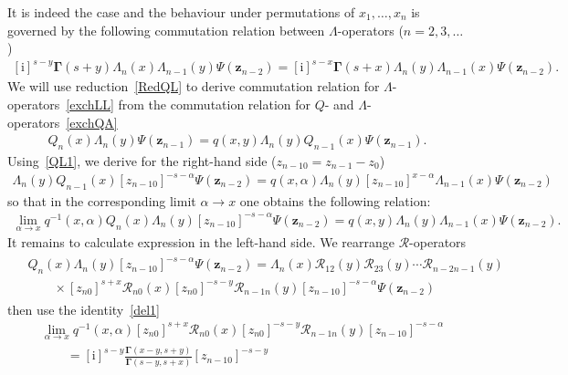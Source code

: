 \documentclass[pdftex]{sigma}
\renewcommand{\imath}{\mathrm{i}}
\numberwithin{equation}{section}
\begin{document}
It is indeed the case and the behaviour under permutations of $x_1, \dots, x_n$ is governed by the following
commutation relation between $\Lambda$-operators ($n=2 ,3 ,\dots$)
\begin{align} \label{exchLL}
[\imath]^{s-y} \mathbf{\Gamma}(s+y)
\Lambda_n(x) \Lambda_{n-1}(y) \Psi(\bm z_{n-2}) =
[\imath]^{s-x} \mathbf{\Gamma}(s+x)
\Lambda_n(y) \Lambda_{n-1}(x) \Psi(\bm z_{n-2}) .
\end{align}
We will use reduction~\eqref{RedQL} to derive commutation relation for $\Lambda$-operators~\eqref{exchLL} from the
commutation relation for $Q$- and $\Lambda$-operators~\eqref{exchQA}
\begin{align*}
Q_n( x) \Lambda_{n}( y) \Psi(\bm z_{n-1}) =
q(x,y) \Lambda_{n}( y) Q_{n-1}( x) \Psi(\bm z_{n-1}) .
\end{align*}
Using~\eqref{QL1}, we derive for the right-hand side ($z_{n-1 0} = z_{n-1} - z_0$)
\begin{align*}
\Lambda_n( y) Q_{n-1}( x) [z_{n-1 0}]^{-s-\alpha} \Psi(\bm z_{n-2}) =
q(x,\alpha) \Lambda_n( y) [z_{n-1 0}]^{x-\alpha} \Lambda_{n-1}(x) \Psi(\bm z_{n-2})
\end{align*}
so that in the corresponding limit $\alpha \to x$ one obtains the following relation:
\begin{align*}
\lim\limits_{\alpha\to x}
 q^{-1}(x,\alpha) Q_n(x) \Lambda_n(y)
[z_{n-1 0}]^{-s-\alpha} \Psi(\bm z_{n-2}) =
q(x,y) \Lambda_{n}(y) \Lambda_{n-1}(x) \Psi(\bm z_{n-2}) .
\end{align*}
It remains to calculate expression in the left-hand side.
We rearrange
$\mathcal{R}$-operators
\begin{align*}
\begin{split}
&Q_n(x) \Lambda_n(y)
[z_{n-1 0}]^{-s-\alpha} \Psi(\bm z_{n-2}) =
\Lambda_n(x) \mathcal{R}_{12}(y)\mathcal{R}_{23}(y)\cdots
\mathcal{R}_{n-2 n-1}(y) \\
&\qquad{} \times
[z_{n0}]^{s+x} \mathcal{R}_{n 0}(x) [z_{n0}]^{-s-y}
\mathcal{R}_{n-1 n}(y) [z_{n-1 0}]^{-s-\alpha} \Psi(\bm z_{n-2})
\end{split}
\end{align*}
then use the identity~\eqref{del1}
\begin{align*}
&
\lim\limits_{\alpha\to x}
q^{-1}(x,\alpha)
[z_{n0}]^{s+x} \mathcal{R}_{n 0}(x) [z_{n0}]^{-s-y}
\mathcal{R}_{n-1 n}(y) [z_{n-1 0}]^{-s-\alpha} \\
&
\qquad =
[\imath]^{s-y} \frac{\mathbf{\Gamma}(x-y,s+y)}
{\mathbf{\Gamma}(s-y,s+x)} [z_{n-1 0}]^{-s-y}
\end{align*}
\end{document}
